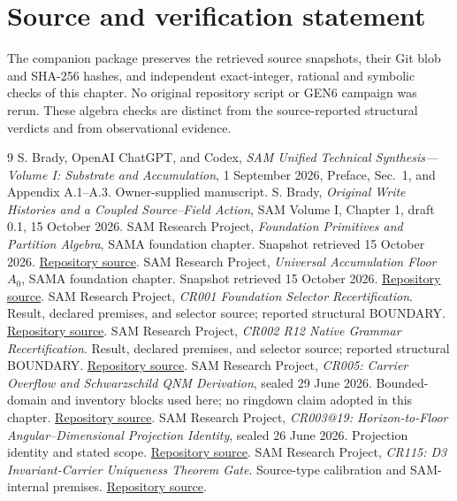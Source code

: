 \documentclass[10pt,twocolumn,letterpaper]{article}
\begin{document}
\section*{Source and verification statement}
The companion package preserves the retrieved source snapshots, their Git blob and SHA-256 hashes, and independent exact-integer, rational and symbolic checks of this chapter. No original repository script or GEN6 campaign was rerun. These algebra checks are distinct from the source-reported structural verdicts and from observational evidence.
\begingroup\footnotesize
\begin{thebibliography}{9}
 S. Brady, OpenAI ChatGPT, and Codex, \emph{SAM Unified Technical Synthesis---Volume I: Substrate and Accumulation}, 1 September 2026, Preface, Sec.\ 1, and Appendix A.1--A.3. Owner-supplied manuscript.
 S. Brady, \emph{Original Write Histories and a Coupled Source--Field Action}, SAM Volume I, Chapter 1, draft 0.1, 15 October 2026.
 SAM Research Project, \emph{Foundation Primitives and Partition Algebra}, SAMA foundation chapter. Snapshot retrieved 15 October 2026. \href{https://github.com/iwtbotiwtwot/SAMA/blob/main/vol_i/01-foundations/foundation-primitives-and-partition-algebra.md}{Repository source}.
 SAM Research Project, \emph{Universal Accumulation Floor $A_0$}, SAMA foundation chapter. Snapshot retrieved 15 October 2026. \href{https://github.com/iwtbotiwtwot/SAMA/blob/main/vol_i/01-foundations/universal-accumulation-floor-a0.md}{Repository source}.
 SAM Research Project, \emph{CR001 Foundation Selector Recertification}. Result, declared premises, and selector source; reported structural BOUNDARY. \href{https://github.com/iwtbotiwtwot/The_Courtroom/blob/main/A0-a_h-D/CR001_foundation_selector_recertification/CR001_result.md}{Repository source}.
 SAM Research Project, \emph{CR002 R12 Native Grammar Recertification}. Result, declared premises, and selector source; reported structural BOUNDARY. \href{https://github.com/iwtbotiwtwot/The_Courtroom/blob/main/R12_duodecimal_radix/CR002_R12_NATIVE_GRAMMAR_RECERTIFICATION/CR002_result.md}{Repository source}.
 SAM Research Project, \emph{CR005: Carrier Overflow and Schwarzschild QNM Derivation}, sealed 29 June 2026. Bounded-domain and inventory blocks used here; no ringdown claim adopted in this chapter. \href{https://github.com/iwtbotiwtwot/The_Courtroom/blob/main/21_GRAVITATIONAL_WAVES/CR005_THETA_CARRIER_OVERFLOW_AND_QNM_DERIVATION/CR005_result.md}{Repository source}.
 SAM Research Project, \emph{CR003@19: Horizon-to-Floor Angular--Dimensional Projection Identity}, sealed 26 June 2026. Projection identity and stated scope. \href{https://github.com/iwtbotiwtwot/The_Courtroom/blob/main/19_BIG_BANG_SUBSTRATE_DERIVED_THERMAL_LADDER/CR003_A_HORIZON_TO_A0_ANGULAR_DIMENSIONAL_PROJECTION_IDENTITY/CR003_result.md}{Repository source}.
 SAM Research Project, \emph{CR115: D3 Invariant-Carrier Uniqueness Theorem Gate}. Source-type calibration and SAM-internal premises. \href{https://github.com/iwtbotiwtwot/The_Courtroom/blob/main/14_FOUNDATIONAL_TESTS/CR115_D3_INVARIANT_CARRIER_UNIQUENESS_THEOREM/CR115_result.md}{Repository source}.
\end{thebibliography}
\endgroup
\end{document}
